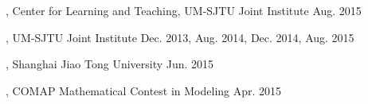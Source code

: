 \begin{cvhonors}
    \cvhonor
    {, Center for Learning and Teaching, UM-SJTU Joint Institute} %
    {Aug. 2015} %
  \end{cvhonors}

\begin{cvhonors}  
  \cvhonor
    {, UM-SJTU Joint Institute} %
    {Dec. 2013, Aug. 2014, Dec. 2014, Aug. 2015} %
  \end{cvhonors}

\begin{cvhonors}
  \cvhonor
    {, Shanghai Jiao Tong University} %
    {Jun. 2015} %
  \end{cvhonors}
    
\begin{cvhonors}
  \cvhonor
    {, COMAP Mathematical Contest in Modeling} %
    {Apr. 2015} %
  \end{cvhonors}


